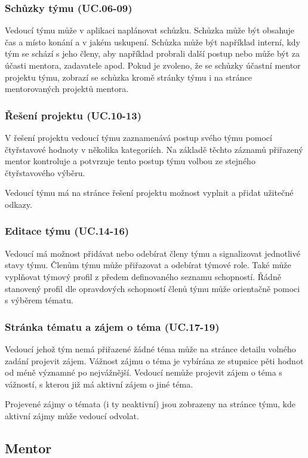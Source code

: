 \documentclass[czech,BP]{thesiskiv}
\begin{document}
			\subsubsection{Schůzky týmu (UC.06-09)}
				\par Vedoucí týmu může v aplikaci naplánovat schůzku. Schůzka může být obsahuje čas a místo konání a v jakém uskupení. Schůzka může být například interní, kdy tým se schází s jeho členy, aby například probrali další postup nebo může být za účasti mentora, zadavatele apod. Pokud je zvoleno, že se schůzky účastní mentor projektu týmu, zobrazí se schůzka kromě stránky týmu i na stránce mentorovaných projektů mentora.
			\subsubsection{Řešení projektu (UC.10-13)}
				\par V řešení projektu vedoucí týmu zaznamenává postup svého týmu pomocí čtyřstavové hodnoty v několika kategoriích. Na základě těchto záznamů přiřazený mentor kontroluje a potvrzuje tento postup týmu volbou ze stejného čtyřstavového výběru.
				\par Vedoucí týmu má na stránce řešení projektu možnost vyplnit a přidat užitečné odkazy.
			\subsubsection{Editace týmu (UC.14-16)}
				\par Vedoucí má možnost přidávat nebo odebírat členy týmu a signalizovat jednotlivé stavy týmu. Členům týmu může přiřazovat a odebírat týmové role. Také může vyplňovat týmový profil z předem definovaného seznamu schopností. Řádně stanovený profil dle opravdových schopností členů týmu může orientačně pomoci s výběrem tématu.
			\subsubsection{Stránka tématu a zájem o téma (UC.17-19)}
				\par Vedoucí jehož tým nemá přiřazené žádné téma může na stránce detailu volného zadání projevit zájem. Vážnost zájmu o téma je vybírána ze stupnice pěti hodnot od méně významné po nejvážnější. Vedoucí nemůže projevit zájem o téma s vážností, s kterou již má aktivní zájem o jiné téma.
				\par Projevené zájmy o témata (i ty neaktivní) jsou zobrazeny na stránce týmu, kde aktivní zájmy může vedoucí odvolat.
		\subsection{Mentor}
\end{document}
